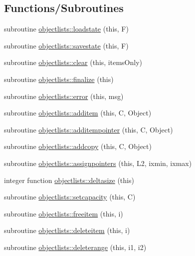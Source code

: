 \subsection*{Functions/\+Subroutines}
\begin{DoxyCompactItemize}
\item 
subroutine \mbox{\hyperlink{namespaceobjectlists_a48fc8838b5a4a323447fdd309cb70d4c}{objectlists\+::loadstate}} (this, F)
\item 
subroutine \mbox{\hyperlink{namespaceobjectlists_a0524c4d9e51cce87cd2864352d116374}{objectlists\+::savestate}} (this, F)
\item 
subroutine \mbox{\hyperlink{namespaceobjectlists_af7dd3c43a123562bc92cf38d6ed508cd}{objectlists\+::clear}} (this, items\+Only)
\item 
subroutine \mbox{\hyperlink{namespaceobjectlists_ad1d73743c5898bdaac2a79a9ade2342c}{objectlists\+::finalize}} (this)
\item 
subroutine \mbox{\hyperlink{namespaceobjectlists_a36abcb049579dcfaee4f3d38cf09b5d1}{objectlists\+::error}} (this, msg)
\item 
subroutine \mbox{\hyperlink{namespaceobjectlists_a36d198e7276f781aed81d70840e2f9da}{objectlists\+::additem}} (this, C, Object)
\item 
subroutine \mbox{\hyperlink{namespaceobjectlists_a20f8947e7e2c99268f61a292e215f144}{objectlists\+::additempointer}} (this, C, Object)
\item 
subroutine \mbox{\hyperlink{namespaceobjectlists_a2487c78e7548dc0d57e860dc447fc9f2}{objectlists\+::addcopy}} (this, C, Object)
\item 
subroutine \mbox{\hyperlink{namespaceobjectlists_a4fc2d0e75594a82db02035609ddab0d5}{objectlists\+::assignpointers}} (this, L2, ixmin, ixmax)
\item 
integer function \mbox{\hyperlink{namespaceobjectlists_a302ff79b4cac76b93d93d5ab7ea9abc4}{objectlists\+::deltasize}} (this)
\item 
subroutine \mbox{\hyperlink{namespaceobjectlists_a3f4c3dd9be50ae77b46cec13a3345fad}{objectlists\+::setcapacity}} (this, C)
\item 
subroutine \mbox{\hyperlink{namespaceobjectlists_a180e000881c5eca28ea4c77daec5d47b}{objectlists\+::freeitem}} (this, i)
\item 
subroutine \mbox{\hyperlink{namespaceobjectlists_a8110526567f8e6cf9fda3be8654005ad}{objectlists\+::deleteitem}} (this, i)
\item 
subroutine \mbox{\hyperlink{namespaceobjectlists_ac82708b7b56f4fca7c7e55d43a84ad84}{objectlists\+::deleterange}} (this, i1, i2)

\end{DoxyCompactItemize}
